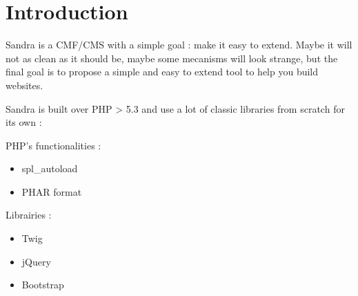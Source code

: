 \chapter*{Introduction}

Sandra is a CMF/CMS with a simple goal : make it easy to extend. Maybe it will not as clean as it should be, maybe some mecanisms will look strange, but the final goal is to propose a simple and easy to extend tool to help you build websites.

Sandra is built over PHP > 5.3 and use a lot of classic libraries from scratch for its own :

PHP's functionalities :

\begin{itemize}
    \item spl\_autoload
    \item PHAR format
\end{itemize}

Librairies :

\begin{itemize}
    \item Twig
    \item jQuery
    \item Bootstrap
\end{itemize}
